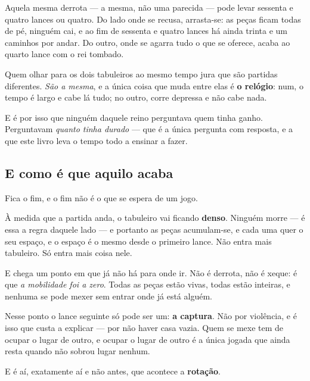 \documentclass[livro.tex]{subfiles}
\begin{document}
Aquela mesma derrota --- a mesma, não uma parecida --- pode levar sessenta e quatro lances ou
quatro. Do lado onde se recusa, arrasta-se: as peças ficam todas de pé, ninguém cai, e ao fim de
sessenta e quatro lances há ainda trinta e um caminhos por andar. Do outro, onde se agarra tudo o
que se oferece, acaba ao quarto lance com o rei tombado.

\medskip

Quem olhar para os dois tabuleiros ao mesmo tempo jura que são partidas diferentes. \emph{São a
mesma}, e a única coisa que muda entre elas é \textbf{o relógio}: num, o tempo é largo e cabe lá
tudo; no outro, corre depressa e não cabe nada.

\medskip

E é por isso que ninguém daquele reino perguntava quem tinha ganho. Perguntavam \emph{quanto
tinha durado} --- que é a única pergunta com resposta, e a que este livro leva o tempo todo a
ensinar a fazer.



\subsection*{E como é que aquilo acaba}

Fica o fim, e o fim não é o que se espera de um jogo.

\medskip

À medida que a partida anda, o tabuleiro vai ficando \textbf{denso}. Ninguém morre --- é essa a
regra daquele lado --- e portanto as peças acumulam-se, e cada uma quer o seu espaço, e o espaço é
o mesmo desde o primeiro lance. Não entra mais tabuleiro. Só entra mais coisa nele.

\medskip

E chega um ponto em que já não há para onde ir. Não é derrota, não é xeque: é que \emph{a
mobilidade foi a zero}. Todas as peças estão vivas, todas estão inteiras, e nenhuma se pode mexer
sem entrar onde já está alguém.

\medskip

Nesse ponto o lance seguinte só pode ser um: \textbf{a captura}. Não por violência, e é isso que
custa a explicar --- por não haver casa vazia. Quem se mexe tem de ocupar o lugar de outro, e
ocupar o lugar de outro é a única jogada que ainda resta quando não sobrou lugar nenhum.

\medskip

E é aí, exatamente aí e não antes, que acontece a \textbf{rotação}.
\end{document}
